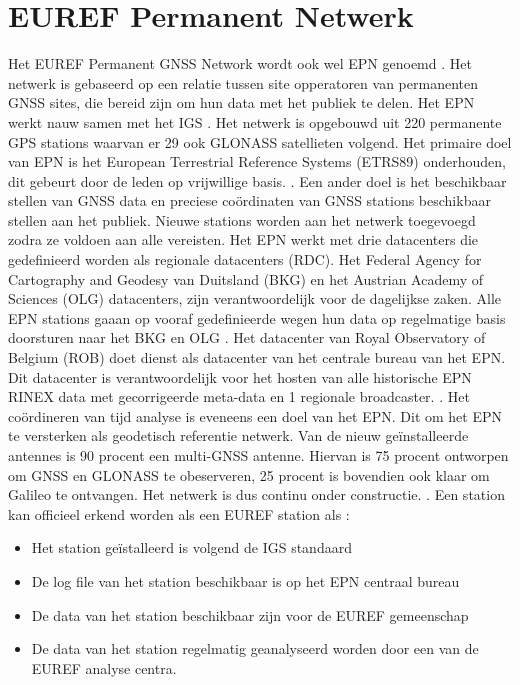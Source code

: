 \section{EUREF Permanent Netwerk}
Het EUREF Permanent GNSS Network wordt ook wel EPN genoemd \cite{LBibEPN3,LBibEPN2,LBibEPN}. Het netwerk is gebaseerd op een relatie tussen site opperatoren van permanenten GNSS sites, die bereid zijn om hun data met het publiek te delen. Het EPN werkt nauw samen met het IGS \cite{LBibEPN3}. Het netwerk is opgebouwd uit 220 permanente GPS stations waarvan er 29 ook GLONASS satellieten volgend. Het primaire doel van EPN is het European Terrestrial Reference Systems (ETRS89) onderhouden, dit gebeurt door de leden op vrijwillige basis. \cite{LBibEPN}  \cite{LBibEPN2}. Een ander doel is het beschikbaar stellen van GNSS data en preciese co\"ordinaten van GNSS stations beschikbaar stellen aan het publiek. Nieuwe stations worden aan het netwerk toegevoegd zodra ze voldoen aan alle vereisten. Het EPN werkt met drie datacenters die gedefinieerd worden als regionale datacenters (RDC). Het Federal Agency for Cartography and Geodesy van Duitsland (BKG) en het Austrian Academy of Sciences (OLG)  datacenters, zijn verantwoordelijk voor de dagelijkse zaken. Alle EPN stations gaaan op vooraf gedefinieerde wegen hun data op regelmatige basis doorsturen naar het BKG en OLG \cite{LBibEPN2}. Het datacenter van Royal Observatory of Belgium (ROB) doet dienst als datacenter van het centrale bureau van het EPN. Dit datacenter is verantwoordelijk voor het hosten van alle historische EPN RINEX data met gecorrigeerde meta-data en 1 regionale broadcaster. \cite{LBibEPN2,LBibEPN3}. Het co\"ordineren van tijd analyse is eveneens een doel van het EPN. Dit om het EPN te versterken als geodetisch referentie netwerk. Van de nieuw ge\"installeerde antennes is 90 procent een multi-GNSS antenne. Hiervan is 75 procent ontworpen om GNSS en GLONASS te obeserveren, 25 procent is bovendien ook klaar om Galileo te ontvangen. Het netwerk is dus continu onder constructie. \cite{LBibEPN3}. Een station kan officieel erkend worden als een EUREF station als \cite{LBibGNSS8}:
\begin{itemize}
	\item Het station ge\"istalleerd is volgend de IGS standaard
	\item De log file van het station beschikbaar is op het EPN centraal bureau
	\item De data van het station beschikbaar zijn voor de EUREF gemeenschap
	\item De data van het station regelmatig geanalyseerd worden door een van de EUREF analyse centra. 
\end{itemize}


